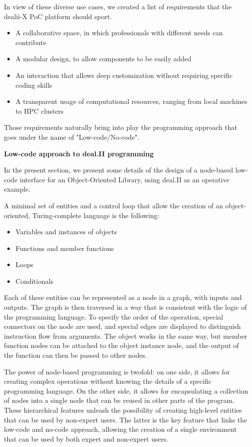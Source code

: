 \documentclass[a4paper,12pt, numbers]{article}
\begin{document}
In view of these diverse use cases, we created a list of requirements that the dealii-X PoC platform should sport.
\begin{itemize}
\item A collaborative space, in which professionals with different needs can contribute
\item A modular design, to allow components to be easily added
\item An interaction that allows deep customization without requiring specific coding skills
\item A transparent usage of computational resources, ranging from local machines to HPC clusters
\end{itemize}

Those requirements naturally bring into play the programming approach that goes under the name of "Low-code/No-code".


\noindent\textbf{Low-code approach to deal.II programming}

In the present section, we present some details of the design of a node-based low-code interface for an Object-Oriented Library, using deal.II as an operative example.

A minimal set of entities and a control loop that allow the creation of an object-oriented, Turing-complete language is the following:
\begin{itemize}
\item Variables and instances of objects
\item Functions and member functions
\item Loops
\item Conditionals
\end{itemize}

Each of these entities can be represented as a node in a graph, with inputs and outputs. The graph is then traversed in a way that is consistent with the logic of the programming language. To specify the order of the operation, special connectors on the node are used, and special edges are displayed to distinguish instruction flow from arguments. The object works in the same way, but member function nodes can be attached to the object instance node, and the output of the function can then be passed to other nodes.

The power of node-based programming is twofold: on one side, it allows for creating complex operations without knowing the details of a specific programming language. On the other side, it allows for encapsulating a collection of nodes into a single node that can be reused in other parts of the program. These hierarchical features unleash the possibility of creating high-level entities that can be used by non-expert users. The latter is the key feature that links the low-code and no-code approach, allowing the creation of a single environment that can be used by both expert and non-expert users.
\end{document}
